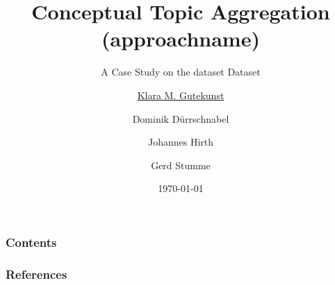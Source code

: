 \documentclass[10pt]{beamer}
\title[\university{}]{Conceptual Topic Aggregation (\acs{approachname})}
\subtitle{A Case Study on the \acs{dataset} Dataset}
\author[Klara M. Gutekunst]{\underline{Klara M. Gutekunst} \and Dominik Dürrschnabel \and Johannes Hirth \and Gerd Stumme}
\institute[klara.gutekunst@uni-kassel.de]{\university{}}
\date[\today]
{\today}
\begin{document}

\frame{\titlepage}
\begin{frame}
\frametitle{Contents}
\tableofcontents
\end{frame}
















\begin{frame}[allowframebreaks]
\frametitle{References}
\printbibliography
\end{frame}



\end{document}
